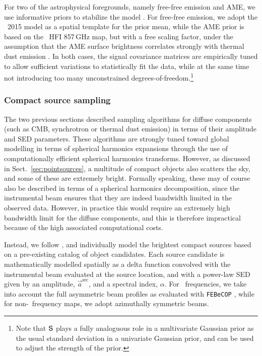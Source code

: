 \documentclass[twocolumn]{aa}
\renewcommand{\a}[0]{\vec{a}}
\renewcommand{\S}[0]{\tens{S}}
\begin{document}
For two of the astrophysical foregrounds, namely free-free emission
and AME, we use informative priors to stabilize the model
\citep{bp13}. For free-free emission, we adopt the \Planck\ 2015 model
\citep{planck2014-a12} as a spatial template for the prior mean, while
the AME prior is based on the \Planck\ HFI 857\,GHz map, but with a
free scaling factor, under the assumption that the AME surface
brightness correlates strongly with thermal dust emission
\citep{planck2014-a12}. In both cases, the signal covariance matrices
are empirically tuned to allow sufficient variations to statistically
fit the data, while at the same time not introducing too many
unconstrained degrees-of-freedom.\footnote{Note that $\S$ plays a
  fully analoguous role in a multivariate Gaussian prior as the usual
  standard deviation in a univariate Gaussian prior, and can be used
  to adjust the strength of the prior.}

\subsubsection{Compact source sampling}
\label{sec:ptsrc}  

The two previous sections described sampling algorithms for diffuse
components (such as CMB, synchrotron or thermal dust emission) in
terms of their amplitude and SED parameters. These algorithms are
strongly tuned toward global modelling in terms of spherical harmonics
expansions through the use of computationally efficient spherical
harmonics transforms. However, as discussed in
Sect.~\ref{sec:pointsources}, a multitude of compact objects also
scatters the sky, and some of these are extremely bright. Formally
speaking, these may of course also be described in terms of a
spherical harmonics decomposition, since the instrumental beam ensures
that they are indeed bandwidth limited in the observed data. However,
in practice this would require an extremely high bandwidth limit for the
diffuse components, and this is therefore impractical because of the
high associated computational costs.

Instead, we follow \citet{planck2016-l04}, and individually model the
brightest compact sources based on a pre-existing catalog of object
candidates. Each source candidate is mathematically modelled spatially
as a delta function convolved with the instrumental beam evaluated at
the source location, and with a power-law SED given by an amplitude,
$\a^{\mathrm{src}}$, and a spectral index, $\alpha$. For
\Planck\ frequencies, we take into account the full asymmetric beam
profiles as evaluated with \texttt{FEBeCOP} \citep{mitra2010}, while for
non-\Planck\ frequency maps, we adopt azimuthally symmetric beams.
\end{document}
